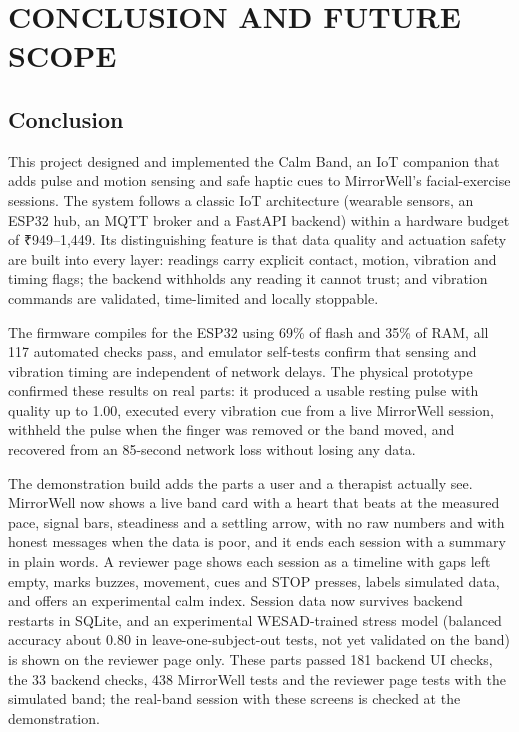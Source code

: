 \documentclass[12pt,letterpaper,oneside]{report}
\begin{document}
\chapter{CONCLUSION AND FUTURE SCOPE}\label{ch:7}

\section{Conclusion}\label{sec:7.1}

This project designed and implemented the Calm Band, an IoT companion that adds pulse and motion sensing and safe haptic cues to MirrorWell's facial-exercise sessions. The system follows a classic IoT architecture (wearable sensors, an ESP32 hub, an MQTT broker and a FastAPI backend) within a hardware budget of ₹949–1,449. Its distinguishing feature is that data quality and actuation safety are built into every layer: readings carry explicit contact, motion, vibration and timing flags; the backend withholds any reading it cannot trust; and vibration commands are validated, time-limited and locally stoppable.


The firmware compiles for the ESP32 using 69\% of flash and 35\% of RAM, all 117 automated checks pass, and emulator self-tests confirm that sensing and vibration timing are independent of network delays. The physical prototype confirmed these results on real parts: it produced a usable resting pulse with quality up to 1.00, executed every vibration cue from a live MirrorWell session, withheld the pulse when the finger was removed or the band moved, and recovered from an 85-second network loss without losing any data.


The demonstration build adds the parts a user and a therapist actually see. MirrorWell now shows a live band card with a heart that beats at the measured pace, signal bars, steadiness and a settling arrow, with no raw numbers and with honest messages when the data is poor, and it ends each session with a summary in plain words. A reviewer page shows each session as a timeline with gaps left empty, marks buzzes, movement, cues and STOP presses, labels simulated data, and offers an experimental calm index. Session data now survives backend restarts in SQLite, and an experimental WESAD-trained stress model (balanced accuracy about 0.80 in leave-one-subject-out tests, not yet validated on the band) is shown on the reviewer page only. These parts passed 181 backend UI checks, the 33 backend checks, 438 MirrorWell tests and the reviewer page tests with the simulated band; the real-band session with these screens is checked at the demonstration.
\end{document}
